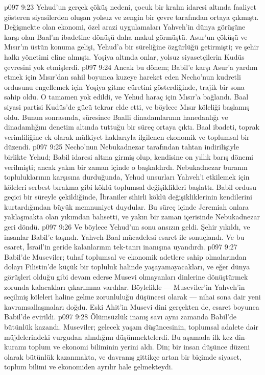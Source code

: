 \vs p097 9:23 Yehud’un gerçek çöküş nedeni, çocuk bir kralın idaresi altında faaliyet gösteren siyasilerden oluşan yolsuz ve zengin bir çevre tarafından ortaya çıkmıştı. Değişmekte olan ekonomi, özel arazi uygulamaları Yahveh’in dünya görüşüne karşı olan Baal’ın ibadetine dönüşü daha makul görmüştü. Asur’un çöküşü ve Mısır’ın üstün konuma gelişi, Yehud’a bir süreliğine özgürlüğü getirmişti; ve şehir halkı yönetimi eline almıştı. Yoşiya altında onlar, yolsuz siyasetçilerin Kudüs çevresini yok etmişlerdi.
\vs p097 9:24 Ancak bu dönem; Babil’e karşı Asur’a yardım etmek için Mısır’dan sahil boyunca kuzeye hareket eden Necho’nun kudretli ordusunu engellemek için Yoşiya gitme cüretini gösterdiğinde, trajik bir sona sahip oldu. O tamamen yok edildi, ve Yehud haraç için Mısır’a bağlandı. Baal siyasi partisi Kudüs’de gücü tekrar elde etti, ve böylece  Mısır köleliği başlamış oldu. Bunun sonrasında, süresince Baalli dinadamlarının hanedanlığı ve dinadamlığını denetim altında tuttuğu bir süreç ortaya çıktı. Baal ibadeti, toprak verimliliğine ek olarak mülkiyet haklarıyla ilgilenen ekonomik ve toplumsal bir düzendi.
\vs p097 9:25 Necho’nun Nebukadnezar tarafından tahtan indirilişiyle birlikte Yehud; Babil idaresi altına girmiş olup, kendisine on yıllık barış dönemi verilmişti; ancak yakın bir zaman içinde o başkaldırdı. Nebukadnezar buranın topluluklarının karşısına durduğunda, Yehud unsurları Yahveh’i etkilemek için köleleri serbest bırakma gibi köklü toplumsal değişiklikleri başlattı. Babil ordusu geçici bir süreyle çekildiğinde, İbraniler sihirli köklü değişikliklerinin kendilerini kurtardığından büyük memnuniyet duydular. Bu süreç içinde Jeremiah onlara yaklaşmakta olan yıkımdan bahsetti, ve yakın bir zaman içerisinde Nebukadnezar geri döndü.
\vs p097 9:26 Ve böylece Yehud’un sonu ansızın geldi. Şehir yıkıldı, ve insanlar Babil’e taşındı. Yahveh\hyp{}Baal mücadelesi esaret ile sonuçlandı. Ve bu esaret, İsrail’in geride kalanlarının tek\hyp{}tanrı inanışına uyandırdı.
\vs p097 9:27 Babil’de Museviler; tuhaf toplumsal ve ekonomik adetlere sahip olmalarından dolayı Filistin’de küçük bir topluluk halinde yaşayamayacakları, ve eğer dünya görüşleri olduğu gibi devam ederse Musevi olmayanları dinlerine dönüştürmek zorunda kalacakları çıkarımına vardılar. Böylelikle --- Museviler’in Yahveh’in seçilmiş köleleri haline gelme zorunluluğu düşüncesi olarak --- nihai sona dair yeni kavramsallaşmaları doğdu. Eski Ahit’in Musevi dini gerçekten de, esaret boyunca Babil’de evirildi.
\vs p097 9:28 Ölümsüzlük inanış savı aynı zamanda Babil’de bütünlük kazandı. Museviler; gelecek yaşam düşüncesinin, toplumsal adalete dair müjdelerindeki vurgudan alındığını düşünmektelerdi. Bu aşamada ilk kez din\hyp{}kuramı toplum ve ekonomi biliminin yerini aldı. Din; bir insan düşünce düzeni olarak bütünlük kazanmakta, ve davranış gittikçe artan bir biçimde siyaset, toplum bilimi ve ekonomiden ayrılır hale gelmekteydi.

